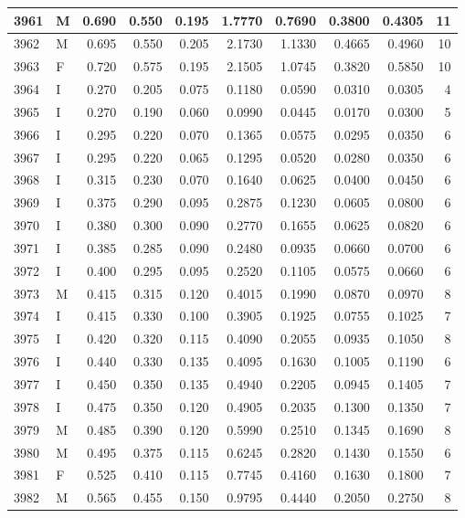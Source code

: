 \documentclass[9pt,twocolumn,twoside,]{pnas-new}
\begin{document}
\begin{tabular}{l|l|r|r|r|r|r|r|r|r}
\hline
3961 & M & 0.690 & 0.550 & 0.195 & 1.7770 & 0.7690 & 0.3800 & 0.4305 & 11\\
\hline
3962 & M & 0.695 & 0.550 & 0.205 & 2.1730 & 1.1330 & 0.4665 & 0.4960 & 10\\
\hline
3963 & F & 0.720 & 0.575 & 0.195 & 2.1505 & 1.0745 & 0.3820 & 0.5850 & 10\\
\hline
3964 & I & 0.270 & 0.205 & 0.075 & 0.1180 & 0.0590 & 0.0310 & 0.0305 & 4\\
\hline
3965 & I & 0.270 & 0.190 & 0.060 & 0.0990 & 0.0445 & 0.0170 & 0.0300 & 5\\
\hline
3966 & I & 0.295 & 0.220 & 0.070 & 0.1365 & 0.0575 & 0.0295 & 0.0350 & 6\\
\hline
3967 & I & 0.295 & 0.220 & 0.065 & 0.1295 & 0.0520 & 0.0280 & 0.0350 & 6\\
\hline
3968 & I & 0.315 & 0.230 & 0.070 & 0.1640 & 0.0625 & 0.0400 & 0.0450 & 6\\
\hline
3969 & I & 0.375 & 0.290 & 0.095 & 0.2875 & 0.1230 & 0.0605 & 0.0800 & 6\\
\hline
3970 & I & 0.380 & 0.300 & 0.090 & 0.2770 & 0.1655 & 0.0625 & 0.0820 & 6\\
\hline
3971 & I & 0.385 & 0.285 & 0.090 & 0.2480 & 0.0935 & 0.0660 & 0.0700 & 6\\
\hline
3972 & I & 0.400 & 0.295 & 0.095 & 0.2520 & 0.1105 & 0.0575 & 0.0660 & 6\\
\hline
3973 & M & 0.415 & 0.315 & 0.120 & 0.4015 & 0.1990 & 0.0870 & 0.0970 & 8\\
\hline
3974 & I & 0.415 & 0.330 & 0.100 & 0.3905 & 0.1925 & 0.0755 & 0.1025 & 7\\
\hline
3975 & I & 0.420 & 0.320 & 0.115 & 0.4090 & 0.2055 & 0.0935 & 0.1050 & 8\\
\hline
3976 & I & 0.440 & 0.330 & 0.135 & 0.4095 & 0.1630 & 0.1005 & 0.1190 & 6\\
\hline
3977 & I & 0.450 & 0.350 & 0.135 & 0.4940 & 0.2205 & 0.0945 & 0.1405 & 7\\
\hline
3978 & I & 0.475 & 0.350 & 0.120 & 0.4905 & 0.2035 & 0.1300 & 0.1350 & 7\\
\hline
3979 & M & 0.485 & 0.390 & 0.120 & 0.5990 & 0.2510 & 0.1345 & 0.1690 & 8\\
\hline
3980 & M & 0.495 & 0.375 & 0.115 & 0.6245 & 0.2820 & 0.1430 & 0.1550 & 6\\
\hline
3981 & F & 0.525 & 0.410 & 0.115 & 0.7745 & 0.4160 & 0.1630 & 0.1800 & 7\\
\hline
3982 & M & 0.565 & 0.455 & 0.150 & 0.9795 & 0.4440 & 0.2050 & 0.2750 & 8\\

\end{tabular}
\end{document}
